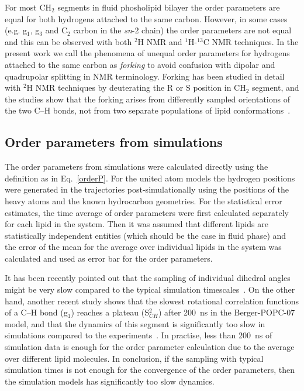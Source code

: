 \documentclass[journal=jacsat,manuscript=article]{achemso}
\begin{document}
For most CH$_2$ segments in fluid phosholipid bilayer the order parameters are equal for both hydrogens attached to the same carbon.
However, in some cases (e.g. g$_1$, g$_3$ and  C$_2$ carbon in the \textit{sn}-2 chain) the order parameters are not equal and this 
can be observed with both $^2$H NMR and $^1$H-$^{13}$C NMR techniques. In the present work we call the phenomena of unequal order parameters 
for hydrogens attached to the same carbon as {\it forking} to avoid confusion with dipolar and quadrupolar splitting in NMR terminology. 
Forking has been studied in detail with $^2$H NMR techniques by deuterating the R or S position in CH$_2$ segment, and
the studies show that the forking arises from differently sampled orientations of the two C--H bonds, not from two 
separate populations of lipid conformations~\cite{engel81,gally81}.



\subsection{Order parameters from simulations}
The order parameters from simulations were calculated directly using the definition as in Eq.~\ref{orderP}.
For the united atom models the hydrogen positions were generated 
in the trajectories post-simulationally using the positions of the heavy atoms and the known hydrocarbon geometries.
For the statistical error estimates, the time average of order parameters were first calculated separately
for each lipid in the system. Then it was assumed that different lipids are statistically independent 
entities (which should be the case in fluid phase) and the error of the mean for the average over individual 
lipids in the system was calculated and used as error bar for the order parameters.

It has been recently pointed out that the sampling of individual dihedral angles might be very
slow compared to the typical simulation timescales~\cite{vogel12}. On the other hand, another recent
study shows that the slowest rotational correlation functions of a C--H bond (g$_1$) reaches a plateau (S$_{CH}^2$)
after 200~ns in the Berger-POPC-07~\cite{ollila07a} model, and that the dynamics of this segment is significantly too slow in simulations
compared to the experiments~\cite{ferreira15}. In practise, less than 200~ns of simulation data is enough for the order parameter
calculation due to the average over different lipid molecules. In conclusion, if the sampling with typical simulation times
is not enough for the convergence of the order parameters, then the simulation models has significantly too slow dynamics.
\end{document}
